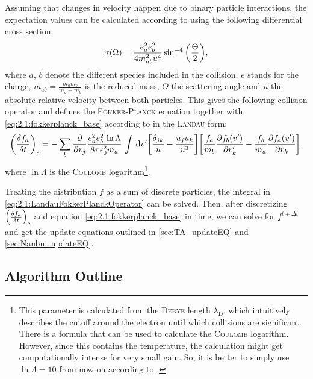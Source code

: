 Assuming that changes in velocity happen due to binary particle interactions, the expectation values can be calculated according to \cite[2]{Rosenbluth1957} using the following differential cross section:
\begin{equation*}
    \sigma\qty(\Omega) = \frac{e_a^2 e_b^2}{4 m_{ab}^2 u^4} \sin^{-4} \qty(\frac{\Theta}{2}) ,
\end{equation*}
where $a$, $b$ denote the different species included in the collision, $e$ stands for the charge, $m_{ab} = \frac{m_a m_b}{m_a+m_b}$ is the reduced mass, $\Theta$ the scattering angle and $u$ the absolute relative velocity between both particles. This gives the following collision operator and defines the \textsc{Fokker-Planck} equation together with \eqref{eq:2.1:fokkerplanck_base} according to \cite{Wang2008} in the \textsc{Landau} form:
\begin{equation}
    \qty(\fdv{f_a}{t})_\mathrm{c} = - \sum_b \pdv{v_j} \frac{e_a^2 e_b^2 \,\ln\Lambda}{8 \pi \epsilon_0^2 m_a} \, \int \, \dd v^\prime \qty[\frac{\delta_{jk}}{u} - \frac{u_j u_k}{u^3}] \qty[\frac{f_a}{m_b} \pdv{f_b\qty(v^\prime)}{v_k^\prime} - \frac{f_b}{m_a} \pdv{f_a\qty(v^\prime)}{v_k}] , \label{eq:2.1:LandauFokkerPlanckOperator}
\end{equation}
where $\ln\Lambda$ is the \textsc{Coulomb} logarithm\footnote{This parameter is calculated from the \textsc{Debye} length $\lambda_\mathrm{D}$, which intuitively describes the cutoff around the electron until which collisions are significant. There is a formula that can be used to calculate the \textsc{Coulomb} logarithm. However, since this contains the temperature, the calculation might get computationally intense for very small gain. So, it is better to simply use $\ln\Lambda = 10$ from now on according to \cite{fitzpatrick_coulomb_logarithm}.}.

Treating the distribution $f$ as a sum of discrete particles, the integral in \ref{eq:2.1:LandauFokkerPlanckOperator} can be solved. Then, after discretizing $\qty(\fdv{f_a}{t})_\mathrm{c}$ and equation \eqref{eq:2.1:fokkerplanck_base} in time, we can solve for $f^{t + \Delta t}$ and get the update equations outlined in \ref{sec:TA_updateEQ} and \ref{sec:Nanbu_updateEQ}.


\subsection{Algorithm Outline}

